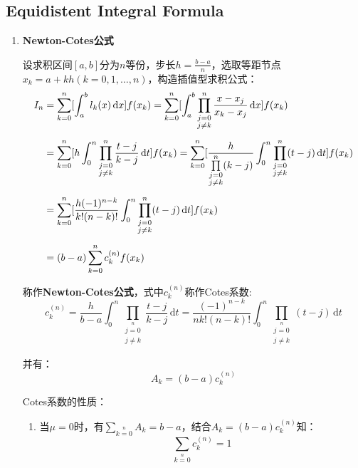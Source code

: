 \subsection{Equidistent Integral Formula}
\begin{enumerate}
\item \textbf{Newton-Cotes公式}

设求积区间$[a,b]$分为$n$等份，步长$h=\frac{b-a}{n}$，选取等距节点$x_k=a+kh(k=0,1,\dots,n)$，构造插值型求积公式：
\begin{align}
I_n &= \sum\limits_{k=0}\limits^n [\int_a^b l_k(x)\,\mathrm{d}x] f(x_k) 
= \sum\limits_{k=0}\limits^n [\int_a^b \prod\limits_{\substack{j=0\\ j\neq k}}\limits^n\frac{x-x_j}{x_k-x_j} \,\mathrm{d}x] f(x_k) \notag \\[2mm]
&= \sum\limits_{k=0}\limits^n [h \int_0^n \prod\limits_{\substack{j=0\\ j\neq k}}\limits^n\frac{t-j}{k-j} \,\mathrm{d}t] f(x_k) 
= \sum\limits_{k=0}\limits^n [\frac{h}{\prod\limits_{\substack{j=0\\ j\neq k}}\limits^n(k-j)}\int_0^n \prod\limits_{\substack{j=0\\ j\neq k}}\limits^n  (t-j) \,\mathrm{d}t] f(x_k)\notag \\[2mm]
&= \sum\limits_{k=0}\limits^n [\frac{h(-1)^{n-k}}{k!(n-k)!}\int_0^n \prod\limits_{\substack{j=0\\ j\neq k}}\limits^n  (t-j) \,\mathrm{d}t] f(x_k)\notag \\[2mm]
&= (b-a)\sum\limits_{k=0}\limits^n c_k^{(n)} f(x_k) 
\end{align}

称作\textbf{Newton-Cotes公式}，式中$c_k^{(n)}$称作Cotes系数:
\begin{equation}
c_k^{(n)} = \frac{h}{b-a}\int_0^n\prod\limits_{\substack{j=0\\ j\neq k}}\limits^{n}\frac{t-j}{k-j}\,\mathrm{d}t
= \frac{(-1)^{n-k}}{nk!(n-k)!}\int_0^n\prod\limits_{\substack{j=0\\ j\neq k}}\limits^{n}(t-j)\,\mathrm{d}t 
\end{equation}

并有：
\begin{equation}
A_k = (b-a)c_k^{(n)}
\end{equation}

Cotes系数的性质：
\begin{enumerate}
\item 当$\mu = 0$时，有$\sum\limits_{k=0}\limits^n A_k = b-a$，结合$A_k = (b-a) c_k^{(n)}$知：
\begin{equation}
\sum\limits_{k=0}\limits^n c_k^{(n)} = 1
\end{equation}


\end{enumerate}
\end{enumerate}
